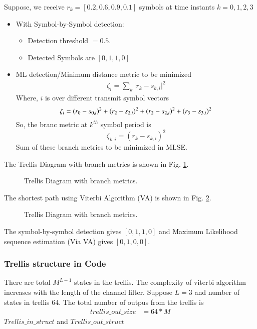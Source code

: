 \documentclass[journal,12pt,twocolumn]{IEEEtran}
\begin{document}
Suppose, we receive $r_k = [0.2,0.6,0.9,0.1]$ symbols at time instants $k=0,1,2,3$
\begin{itemize}
\item With Symbol-by-Symbol detection:
\begin{itemize}
\item Detection threshold  $= 0.5$.
\item Detected Symbols are $[0,1,1,0]$
\end{itemize}
\item ML detection/Minimum distance metric to be minimized
\begin{align}
\zeta_i = \sum_k \vert r_k - s_{k,i} \vert^2
\end{align}
Where, $i$ is over different transmit symbol vectors
\begin{equation}
\zeta_i = (r_0 - s_{0,i})^2 + (r_2 - s_{2,i})^2 \\ + (r_2 - s_{2,i})^2 + (r_3 - s_{3,i})^2
\label{eq:distance_metric}
\end{equation}
So, the branc metric at $k^{th}$ symbol period is
\begin{equation}
\zeta_{k,i} = (r_k - s_{k,i})^2
\end{equation}
Sum of these branch metrics to be minimized in MLSE.
\end{itemize}
The Trellis Diagram with branch metrics is shown in Fig. \ref{fig:branch_metric}.
\begin{figure}[h]
\centering
\resizebox{\columnwidth}{!}{

}
\caption{Trellis Diagram with branch metrics. }
\label{fig:branch_metric}
\end{figure}
The shortest path using Viterbi Algorithm (VA) is shown in Fig. \ref{fig:shortest_path}.
\begin{figure}[h]
\centering
\resizebox{\columnwidth}{!}{

}
\caption{Trellis Diagram with branch metrics. }
\label{fig:shortest_path}
\end{figure}
The symbol-by-symbol detection gives $[0,1,1,0]$ and
Maximum Likelihood sequence estimation (Via VA) gives $[0,1,0,0]$.
\subsubsection{Trellis structure in Code}
There are total $M^{L-1}$ states in the trellis. The complexity of viterbi algorithm increases with the length of the channel filter.
Suppose $L=3$ and number of states in trellis $64$. The total number of outpus from the trellis is
\begin{align}
trellis\_out\_size &= 64*M 
\end{align} 
$Trellis\_in\_struct$ and $Trellis\_out\_struct$ 
\end{document}
